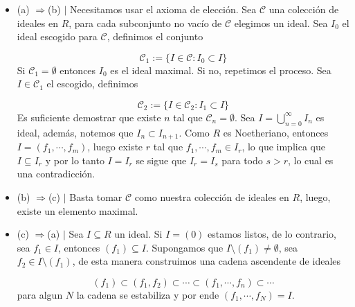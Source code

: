 \documentclass{article}
\begin{document}
\begin{dem} \hspace{1mm}
    \begin{itemize}
        \item (a) $\Rightarrow$(b) $|$ Necesitamos usar el axioma de elección. Sea $\mathcal{C}$
        una colección de ideales en $R$, para cada subconjunto no vacío de $\mathcal{C}$ elegimos
        un ideal. Sea $I_{0}$ el ideal escogido para $\mathcal{C}$, definimos el conjunto

        \begin{equation*}
            \mathcal{C}_{1}:=\{I\in\mathcal{C}:I_{0}\subset I\}
        \end{equation*}
        Si $\mathcal{C}_{1}=\emptyset$ entonces $I_{0}$ es el ideal maximal. Si no, repetimos el
        proceso. Sea $I\in\mathcal{C}_{1}$ el escogido, definimos

        \begin{equation*}
            \mathcal{C}_{2}:=\{I\in\mathcal{C}_{2}:I_{1}\subset I\}
        \end{equation*}
        Es suficiente demostrar que existe $n$ tal que $\mathcal{C}_{n}=\emptyset$. Sea 
        $I=\bigcup_{n=0}^{\infty}I_{n}$ es ideal, además, notemos que $I_{n}\subset I_{n+1}$. 
        Como $R$ es Noetheriano, entonces $I=(f_{1},\cdots,f_{m})$, luego existe $r$ tal que 
        $f_{1},\cdots,f_{m}\in I_{r}$, lo que implica que $I\subseteq I_{r}$ y por lo tanto 
        $I=I_{r}$ se sigue que $I_{r}=I_{s}$ para todo $s>r$, lo cual es una contradicción.

        \item (b) $\Rightarrow$(c) $|$ Basta tomar $\mathcal{C}$ como nuestra colección de ideales
        en $R$, luego, existe un elemento maximal.

        \item (c) $\Rightarrow$(a) $|$ Sea $I\subseteq R$ un ideal. Si $I=(0)$ estamos listos, de
        lo contrario, sea $f_{1}\in I$, entonces $(f_{1})\subseteq I$. Supongamos que 
        $I\setminus(f_{1})\neq\emptyset$, sea $f_{2}\in I\setminus(f_{1})$, de esta manera
        construimos una cadena ascendente de ideales

        \begin{equation*}
            (f_{1})\subset (f_{1},f_{2})\subset\cdots\subset(f_{1},\cdots,f_{n})\subset\cdots
        \end{equation*}
        para algun $N$ la cadena se estabiliza y por ende $(f_{1},\cdots,f_{N})=I$.
    \end{itemize}
\end{dem}
\end{document}
